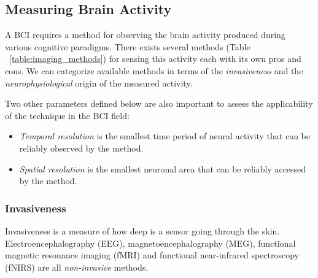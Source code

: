 \documentclass[12pt]{article}
\newcommand\mysubsection[1]{\subsection{#1}}
\newcommand\mysubsubsection[1]{\subsubsection{#1}}
\numberwithin{equation}{section}
\numberwithin{figure}{section}
\numberwithin{table}{section}
\begin{document}
\mysubsection{Measuring Brain Activity}
\par{
    A BCI requires a method for observing the brain activity produced during
    various cognitive paradigms. There exists several methods (Table ~\ref{table:imaging_methods}) for sensing
    this activity each with its own pros and cons. We can categorize available
    methods in terms of the \emph{invasiveness} and the \emph{neurophysiological}
    origin of the measured activity.
}
\par{
    Two other parameters defined below are also important to
    assess the applicability of the technique in the BCI field:
    \begin{itemize}
        \item \emph{Temporal resolution} is the smallest time period of neural activity
            that can be reliably observed by the method.
        \item \emph{Spatial resolution} is the smallest neuronal area that can be
            reliably accessed by the method.
    \end{itemize}
}
\mysubsubsection{Invasiveness}
\par{
    Invasiveness is a measure of how deep is a sensor going through the skin.
    Electroencephalography (EEG), magnetoencephalography (MEG), functional magnetic
    resonance imaging (fMRI) and functional near-infrared spectroscopy (fNIRS)
    are all \emph{non-invasive} methods.
}
\end{document}
